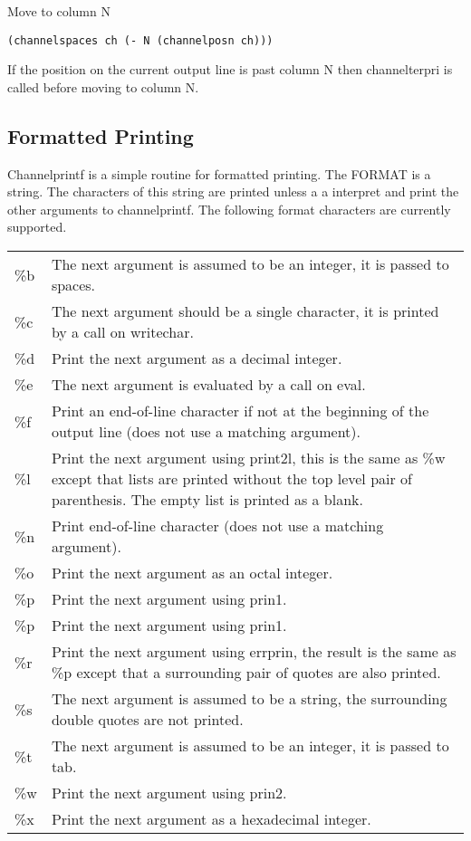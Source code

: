 {}

{    Move to column N }

{\tt(channelspaces ch (- N (channelposn ch)))}

    If  the position on the current output line is past column N
    then channelterpri is called before moving to column N.

\subsection{Formatted Printing}

{}

{   Channelprintf is a simple routine  for formatted  printing.
    The  FORMAT  is a string.  The characters of this string are
    printed unless a %
    a  %
    interpret and print the other  arguments  to  channelprintf.
    The following format characters are currently supported.
}

\begin{tabular}{lp{11.0cm}}
\%b & The next argument is assumed to be an integer, it is passed to spaces.\\
\%c & The next argument should be a single character,
   it is printed by	a call on writechar.\\
\%d & Print the next argument as a decimal integer.\\
\%e & The  next  argument  is evaluated by a call on eval.\\
\%f & Print an end-of-line character if not  
 at  the  beginning  of  the output line 
  (does not use a matching argument).\\
\%l & Print the next argument using print2l, 
this is the same as \%w except that lists
 are  printed without  the  top  level
  pair of parenthesis.
		The empty list is printed as a blank.\\
\%n & Print end-of-line character
	(does  not  use  a matching argument).\\
\%o & Print the next argument as an 
	octal integer.\\
\%p & Print the next argument using prin1.\\
\%p & Print the next argument using prin1.\\
\%r & Print  the  next  argument  using errprin, the
   result  is  the  same  as  \%p  except  that  a
   surrounding pair of quotes are also printed.\\
\%s & The  next  argument is assumed to be a string,
   the surrounding double quotes are not printed.\\
\%t & The next argument is assumed to be an integer,
   it is passed to tab.\\
\%w & Print the next argument using prin2.\\
\%x & Print  the  next  argument  as  a  hexadecimal
   integer.\\
\end{tabular}
    
